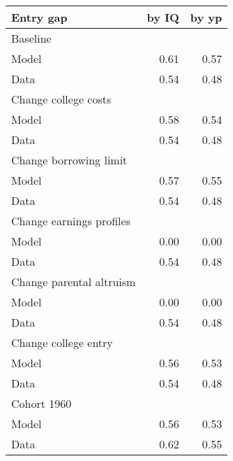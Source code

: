 \begin{tabular}{lrr}
\hline
Entry gap & by IQ  & by yp  \\ 
\hline
Baseline &   &   \\ 
Model & 0.61  & 0.57  \\ 
Data & 0.54  & 0.48  \\ 
Change college costs &   &   \\ 
Model & 0.58  & 0.54  \\ 
Data & 0.54  & 0.48  \\ 
Change borrowing limit &   &   \\ 
Model & 0.57  & 0.55  \\ 
Data & 0.54  & 0.48  \\ 
Change earnings profiles &   &   \\ 
Model & 0.00  & 0.00  \\ 
Data & 0.54  & 0.48  \\ 
Change parental altruism &   &   \\ 
Model & 0.00  & 0.00  \\ 
Data & 0.54  & 0.48  \\ 
Change college entry &   &   \\ 
Model & 0.56  & 0.53  \\ 
Data & 0.54  & 0.48  \\ 
Cohort 1960 &   &   \\ 
Model & 0.56  & 0.53  \\ 
Data & 0.62  & 0.55  \\ 
\hline
\end{tabular}%

